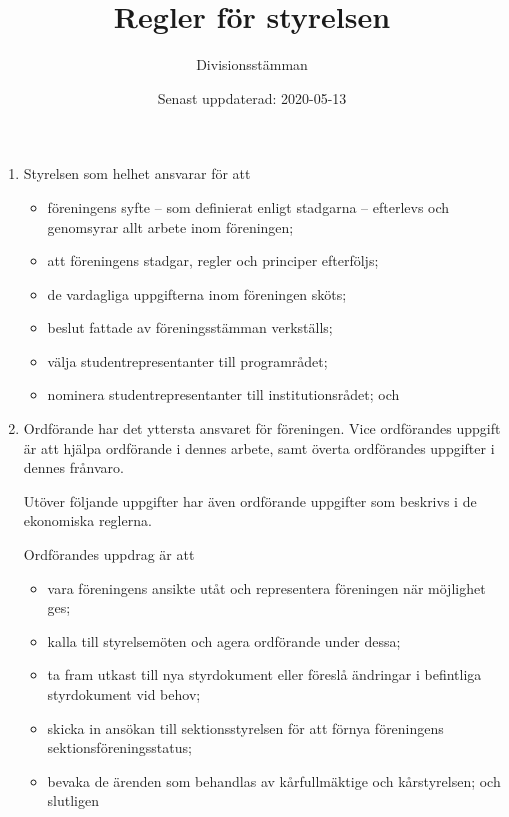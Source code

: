 \documentclass{dvd}
\begin{document}
	\title{Regler för styrelsen}
	\author{Divisionsstämman}
	\date{Senast uppdaterad: 2020-05-13}

	\begin{enumerate}[label=\arabic* §, ref=\arabic*]
		\item Styrelsen som helhet ansvarar för att
		\begin{itemize}
			\item föreningens syfte -- som definierat enligt stadgarna -- efterlevs och genomsyrar allt arbete inom föreningen;

			\item att föreningens stadgar, regler och principer efterföljs;

			\item de vardagliga uppgifterna inom föreningen sköts;

			\item beslut fattade av föreningsstämman verkställs;

			\item välja studentrepresentanter till programrådet;

			\item nominera studentrepresentanter till institutionsrådet; och
		\end{itemize}

		\item Ordförande har det yttersta ansvaret för föreningen.
		Vice ordförandes uppgift är att hjälpa ordförande i dennes arbete, samt överta ordförandes uppgifter i dennes frånvaro.

		Utöver följande uppgifter har även ordförande uppgifter som beskrivs i de ekonomiska reglerna.

		Ordförandes uppdrag är att
		\begin{itemize}
		\item vara föreningens ansikte utåt och representera föreningen när möjlighet ges;

		\item kalla till styrelsemöten och agera ordförande under dessa;

		\item ta fram utkast till nya styrdokument eller föreslå ändringar i befintliga styrdokument vid behov;

		\item skicka in ansökan till sektionsstyrelsen för att förnya föreningens sektionsföreningsstatus;

		\item bevaka de ärenden som behandlas av kårfullmäktige och kårstyrelsen; och slutligen


\end{itemize}
\end{enumerate}
\end{document}
